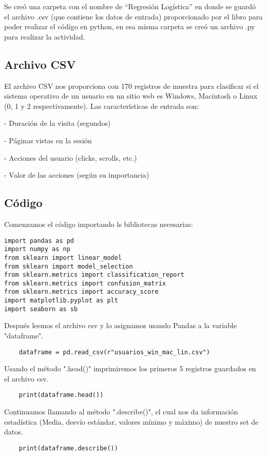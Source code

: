 \documentclass{pssbmac}
\begin{document}
Se creó una carpeta con el nombre de ``Regresión Logística'' en donde se guardó el archivo .csv (que contiene los datos de entrada) proporcionado por el libro para poder realizar el código en python, en esa misma carpeta se creó un archivo .py para realizar la actividad.

\subsection{Archivo CSV}
El archivo CSV nos proporciona con 170 registros de muestra para clasificar si el sistema operativo de un usuario en un sitio web es Windows, Macintosh o Linux (0, 1 y 2 respectivamente). Las características de entrada son:


- Duración de la visita (segundos)


- Páginas vistas en la sesión


- Acciones del usuario (clicks, scrolls, etc.)


- Valor de las acciones (según su importancia)

\subsection{Código}
Comenzamos el código importando ls bibliotecas necesarias:
\begin{lstlisting}
import pandas as pd
import numpy as np
from sklearn import linear_model
from sklearn import model_selection
from sklearn.metrics import classification_report
from sklearn.metrics import confusion_matrix
from sklearn.metrics import accuracy_score
import matplotlib.pyplot as plt
import seaborn as sb
\end{lstlisting}


\vspace{.3cm}
Después leemos el archivo csv y lo asignamos usando Pandas a la variable "dataframe".
\begin{lstlisting}
    dataframe = pd.read_csv(r"usuarios_win_mac_lin.csv")
\end{lstlisting}
Usando el método ".head()" imprimiremos los primeros 5 registros guardados en el archivo csv.
\begin{lstlisting}
    print(dataframe.head())
\end{lstlisting}
Continuamos llamando al método ".describe()", el cual nos da información estadística (Media, desvío estándar, valores mínimo y máximo) de nuestro set de datos.
\begin{lstlisting}
    print(dataframe.describe())
\end{lstlisting}
\end{document}
